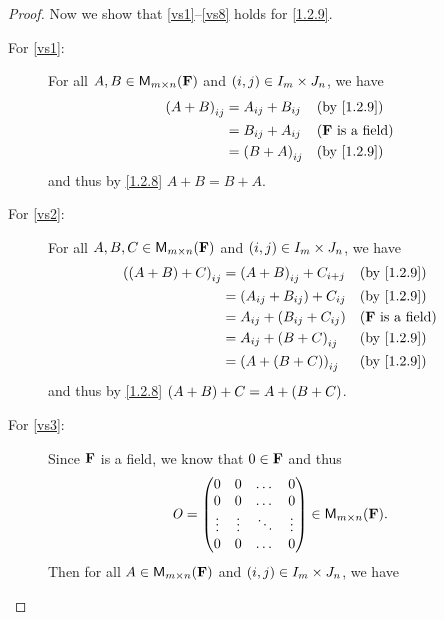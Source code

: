 \begin{proof}
    Now we show that \ref{vs1}--\ref{vs8} holds for \cref{1.2.9}.
    \begin{description}
        \item[For \ref{vs1}:]
            For all \(A, B \in {{\mathsf{M}_{{m} \times n}({\mathbf{F}})}}\) and \(\left\lparen i, j\right\rparen \in I_{m} \times J_{n}\), we have
            \begin{align*}
                \p{A + B}_{i j} & = A_{i j} + B_{i j} &  & \text{(by \cref{1.2.9})}   \\
                                & = B_{i j} + A_{i j} &  & \text{(\(\F\) is a field)} \\
                                & = \p{B + A}_{i j}   &  & \text{(by \cref{1.2.9})}
            \end{align*}
            and thus by \cref{1.2.8} \(A + B = B + A\).
        \item[For \ref{vs2}:]
            For all \(A, B, C \in {{\mathsf{M}_{{m} \times n}({\mathbf{F}})}}\) and \(\left\lparen i, j\right\rparen \in I_{m} \times J_{n}\), we have
            \begin{align*}
                \p{\p{A + B} + C}_{i j} & = \p{A + B}_{i j} + C_{i + j}     &  & \text{(by \cref{1.2.9})}   \\
                                        & = \p{A_{i j} + B_{i j}} + C_{i j} &  & \text{(by \cref{1.2.9})}   \\
                                        & = A_{i j} + \p{B_{i j} + C_{i j}} &  & \text{(\(\F\) is a field)} \\
                                        & = A_{i j} + \p{B + C}_{i j}       &  & \text{(by \cref{1.2.9})}   \\
                                        & = \p{A + \p{B + C}}_{i j}         &  & \text{(by \cref{1.2.9})}
            \end{align*}
            and thus by \cref{1.2.8} \(\left\lparen A + B\right\rparen + C = A + \left\lparen B + C\right\rparen\).
        \item[For \ref{vs3}:]
            Since \(\mathbf{F}\) is a field, we know that \(0 \in \mathbf{F}\) and thus
            \[
                \mathit{O} = \begin{pmatrix}
                    0      & 0      & \dots  & 0      \\
                    0      & 0      & \dots  & 0      \\
                    \vdots & \vdots & \ddots & \vdots \\
                    0      & 0      & \dots  & 0
                \end{pmatrix} \in {{\mathsf{M}_{{m} \times n}({\mathbf{F}})}}.
            \]
            Then for all \(A \in {{\mathsf{M}_{{m} \times n}({\mathbf{F}})}}\) and \(\left\lparen i, j\right\rparen \in I_{m} \times J_{n}\), we have

\end{description}
\end{proof}
